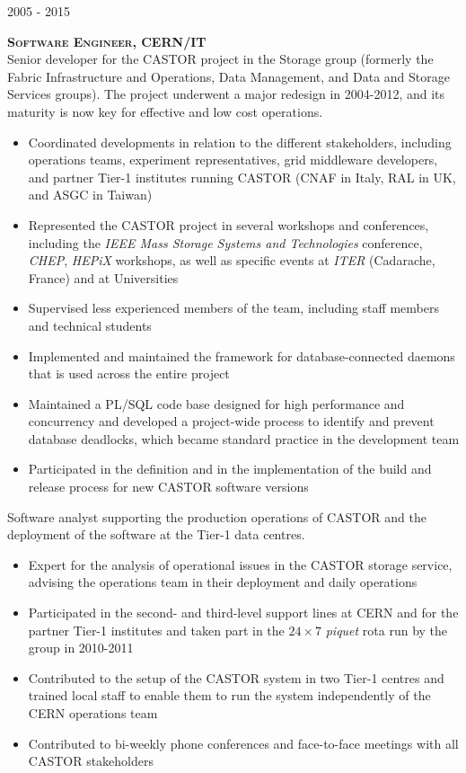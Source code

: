 \documentclass[11pt]{article}
\renewcommand{\subsection}[2]%
        {
         {\bf{\raggedright \scshape #1}}{\bf{\hfill \scshape #2}}\\[-.7\baselineskip]
}
\newenvironment{CompactItemize} {
  \begin{itemize}
  \setlength{\itemsep}{-3pt}
  \setlength{\parsep}{0pt}
  \setlength{\topsep}{-2pt}
  \setlength{\partopsep}{-2pt}
} {\end{itemize}}
\begin{document}
\subsection{2005 - 2015}{Software Engineer, CERN/IT}

Senior developer for the CASTOR project in the Storage group (formerly the Fabric Infrastructure and Operations, Data Management, and Data and Storage Services groups).
The project underwent a major redesign in 2004-2012, and its maturity is now key for effective and low cost operations.

\begin{CompactItemize}
\item Coordinated developments in relation to the different stakeholders, including
  operations teams, experiment representatives, grid middleware developers, and partner Tier-1
  institutes running CASTOR (CNAF in Italy, RAL in UK, and ASGC in Taiwan)
\item Represented the CASTOR project in several workshops and conferences, including the
\emph{IEEE Mass Storage Systems and Technologies} conference, \emph{CHEP}, \emph{HEPiX} workshops, as well as specific events at \emph{ITER} (Cadarache, France) and at Universities
\item Supervised less experienced members of the team, including staff members and technical students
\item Implemented and maintained the framework for database-connected daemons that is used
  across the entire project
\item Maintained a PL/SQL code base designed for high performance and concurrency and developed a
  project-wide process to identify and prevent database deadlocks, which became standard practice in the development team
\item Participated in the definition and in the implementation of the build and release process
  for new CASTOR software versions
\end{CompactItemize}

Software analyst supporting the production operations of CASTOR and the
deployment of the software at the Tier-1 data centres.

\begin{CompactItemize}
\item Expert for the analysis of operational issues in the CASTOR storage service, advising
  the operations team in their deployment and daily operations
\item Participated in the second- and third-level support lines at CERN and for the partner Tier-1
  institutes and taken part in the $24\times7$ \emph{piquet} rota run by the group in 2010-2011
\item Contributed to the setup of the CASTOR system in two Tier-1 centres and trained local
  staff to enable them to run the system independently of the CERN operations team
\item Contributed to bi-weekly phone conferences and face-to-face meetings with all CASTOR stakeholders
\end{CompactItemize}
\end{document}

